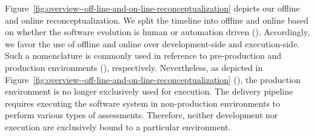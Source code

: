 Figure~\ref{fig:overview--off-line-and-on-line-reconceptualization} depicts our offline and online reconceptualization. We split the timeline into offline and online  based on whether the software evolution is human or automation driven (). Accordingly, we favor the use of offline and online over development-side and execution-side. Such a nomenclature is commonly used in reference to pre-production and production environments (), respectively. Nevertheless, as depicted in Figure~\ref{fig:overview--off-line-and-on-line-reconceptualization} (), the production environment is no longer exclusively used for execution. The delivery pipeline requires executing the software system in non-production environments to perform various types of assessments. Therefore, neither development nor execution are exclusively bound to a particular environment.



